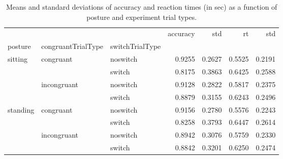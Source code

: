 \begin{table}
\centering
\caption{Means and standard deviations of accuracy and reaction times (in sec) as a function of posture and experiment trial types.}
\label{table-task-switching-replication-reaction-time}
\begin{tabular}{lllrrrr}
\toprule
         &             &        & accuracy &    std &     rt &    std \\
posture & congruantTrialType & switchTrialType &          &        &        &        \\
\midrule
sitting & congruant & noswitch &   0.9255 & 0.2627 & 0.5525 & 0.2191 \\
         &             & switch &   0.8175 & 0.3863 & 0.6425 & 0.2588 \\
         & incongruant & noswitch &   0.9128 & 0.2822 & 0.5817 & 0.2375 \\
         &             & switch &   0.8879 & 0.3155 & 0.6243 & 0.2496 \\
standing & congruant & noswitch &   0.9156 & 0.2780 & 0.5576 & 0.2243 \\
         &             & switch &   0.8258 & 0.3793 & 0.6447 & 0.2614 \\
         & incongruant & noswitch &   0.8942 & 0.3076 & 0.5759 & 0.2330 \\
         &             & switch &   0.8842 & 0.3201 & 0.6250 & 0.2474 \\
\bottomrule
\end{tabular}
\end{table}
